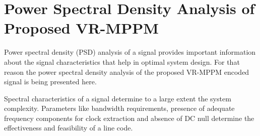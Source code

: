 \chapter{Power Spectral Density Analysis of Proposed VR-MPPM} %
\label{Chapter4}


%

Power spectral density (PSD) analysis of a signal provides important information about the signal characteristics that help in optimal system design. For that reason the power spectral density analysis of the proposed VR-MPPM encoded signal is being presented here.

Spectral characteristics of a signal determine to a large extent the system complexity. Parameters like bandwidth requirements, presence of adequate frequency components for clock extraction and absence of DC null determine the effectiveness and feasibility of a line code.


